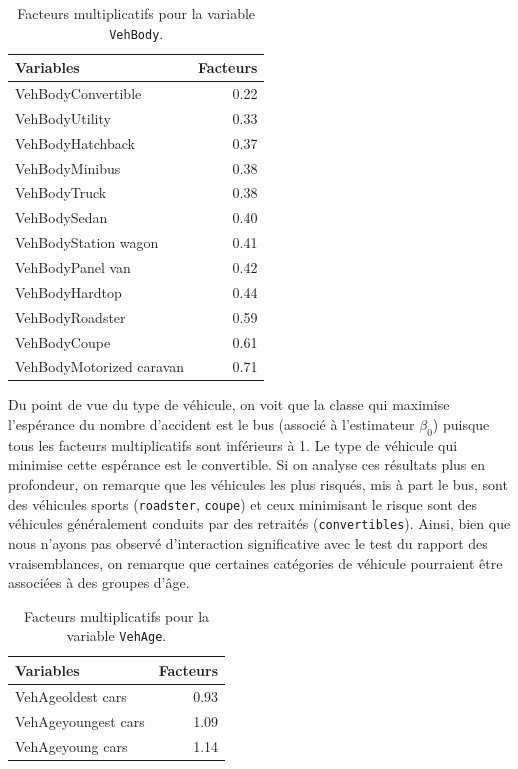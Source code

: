 \documentclass{article}
\begin{document}
	\begin{table}[H]
		\centering
		\begin{tabular}{lr}
			\hline
			Variables & Facteurs \\ 
			\hline
			VehBodyConvertible & 0.22 \\ 
			VehBodyUtility & 0.33 \\ 
			VehBodyHatchback & 0.37 \\ 
			VehBodyMinibus & 0.38 \\ 
			VehBodyTruck & 0.38 \\ 
			VehBodySedan & 0.40 \\ 
			VehBodyStation wagon & 0.41 \\ 
			VehBodyPanel van & 0.42 \\ 
			VehBodyHardtop & 0.44 \\ 
			VehBodyRoadster & 0.59 \\ 
			VehBodyCoupe & 0.61 \\ 
			VehBodyMotorized caravan & 0.71 \\ 
			\hline
		\end{tabular}
		\caption{Facteurs multiplicatifs pour la variable \texttt{VehBody}.}
		\label{facteurs_multiplicatifs_VehBody}
	\end{table}
	Du point de vue du type de véhicule, on voit que la classe qui maximise l'espérance du nombre d'accident est le bus (associé à l'estimateur $\beta_0$) puisque tous les facteurs multiplicatifs sont inférieurs à 1. Le type de véhicule qui minimise cette espérance est le convertible. Si on analyse ces résultats plus en profondeur, on remarque que les véhicules les plus risqués, mis à part le bus, sont des véhicules sports (\texttt{roadster}, \texttt{coupe}) et ceux minimisant le risque sont des véhicules généralement conduits par des retraités (\texttt{convertibles}). Ainsi, bien que nous n'ayons pas observé d'interaction significative avec le test du rapport des vraisemblances, on remarque que certaines catégories de véhicule pourraient être associées à des groupes d'âge.

	\begin{table}[H]
		\centering
		\begin{tabular}{lr}
			\hline
			Variables & Facteurs \\ 
			\hline
			VehAgeoldest cars & 0.93 \\ 
			VehAgeyoungest cars & 1.09 \\ 
			VehAgeyoung cars & 1.14 \\ 
			\hline
		\end{tabular}
		\caption{Facteurs multiplicatifs pour la variable \texttt{VehAge}.}
		\label{facteurs_multiplicatifs_VehAge}
	\end{table}
	
\end{document}
